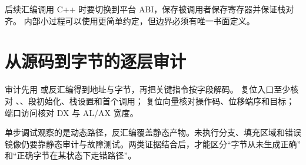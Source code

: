 后续汇编调用 C++ 时要切换到平台 ABI，保存被调用者保存寄存器并保证栈对齐。
内部小过程可以使用更简单约定，但边界必须有唯一书面定义。

\section{从源码到字节的逐层审计}

审计先用  或反汇编得到地址与字节，再把关键指令按字段解码。
复位入口至少核对 、、段初始化、栈设置和首个调用；
复位向量核对操作码、位移端序和目标；端口访问核对 DX 与 AL/AX 宽度。

单步调试观察的是动态路径，反汇编覆盖静态产物。未执行分支、填充区域和错误
镜像仍要靠静态审计与故障测试。两类证据结合后，才能区分“字节从未生成正确”
和“正确字节在某状态下走错路径”。
